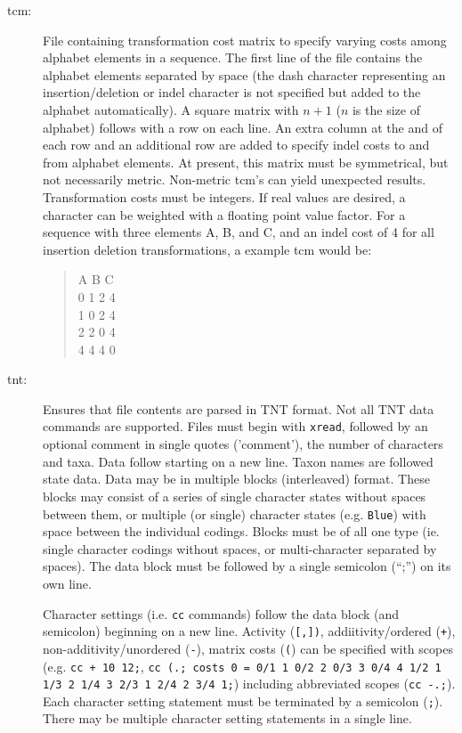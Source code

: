 \begin{description}
		\item [tcm:] File containing transformation cost matrix to specify varying costs among alphabet elements 
		in a sequence. The first line of the file contains the alphabet elements separated by space (the dash 
		character representing an insertion/deletion or indel character is not specified but added to the alphabet 
		automatically). A square matrix with $n + 1$ ($n$ is the size of alphabet) follows with a row on each line. 
		An extra column at the and of each row and an additional row are added to specify indel costs to and from 
		alphabet elements. At present, this matrix must be symmetrical, but not necessarily metric. Non-metric 
		tcm's can yield unexpected results. Transformation costs must be integers. If real values are desired, a 
		character can be weighted with a floating point value factor. For a sequence with three elements A, B, and 
		C, and an indel cost of 4 for all insertion deletion transformations, a example tcm would be:
		
			\begin{quote}
				A B C\\
				0 1 2 4\\
				1 0 2 4\\
				2 2 0 4\\
			  4 4 4 0\\
		  	 \end{quote}
  		 	  
		\item [tnt:] Ensures that file contents are parsed in TNT \citep{Goloboffetal2008} format. Not all TNT data 
		commands are supported. Files must begin with \texttt{xread}, followed by an optional comment in single 
		quotes ('comment'), the number of characters and taxa. Data follow starting on a new line. Taxon names 
		are followed state data. Data may be in multiple blocks (interleaved) format. These 	blocks may consist 
		of a series of single character states without spaces between them, or multiple (or single) character states 
		(e.g. \texttt{Blue}) with space between the individual codings. Blocks must be of all one type (ie. single 
		character codings without spaces, or multi-character separated by spaces). The data block must be followed 
		by a single semicolon (``;'') on its own line.
			
		Character settings (i.e. \texttt{cc} commands) follow the data block (and semicolon) beginning on a new line. 
		Activity (\texttt{[,])}, addiitivity/ordered (\texttt{+}), non-additivity/unordered (\texttt{-}), matrix costs (\texttt{(}) 
		can be specified with scopes (e.g. \texttt{cc + 10 12;}, \texttt{cc (.; costs 0 = 0/1 1 0/2 2 0/3 3 0/4 4 1/2 1 1/3 2 1/4 3 2/3 1 2/4 2 3/4 1;}) 
		including abbreviated scopes (\texttt{cc -.;}). Each character setting statement must be terminated by a 
		semicolon (\texttt{;}). There may be multiple character setting statements in a single line. 
		  

\end{description}
